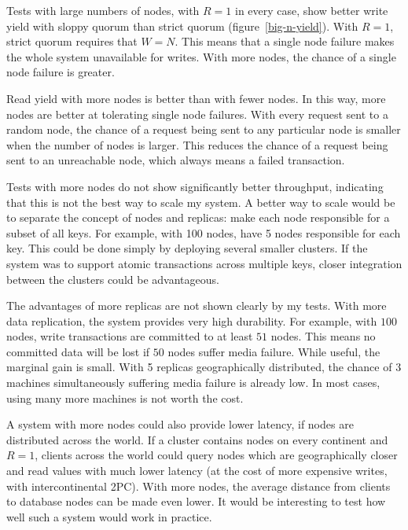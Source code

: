 \documentclass[12pt,a4paper,twoside,openany]{report}
\begin{document}
Tests with large numbers of nodes, with $R = 1$ in every case, show better write yield with sloppy quorum than strict quorum (figure~\ref{big-n-yield}). With $R = 1$, strict quorum requires that $W = N$. This means that a single node failure makes the whole system unavailable for writes. With more nodes, the chance of a single node failure is greater.

Read yield with more nodes is better than with fewer nodes. In this way, more nodes are better at tolerating single node failures. With every request sent to a random node, the chance of a request being sent to any particular node is smaller when the number of nodes is larger. This reduces the chance of a request being sent to an unreachable node, which always means a failed transaction.

Tests with more nodes do not show significantly better throughput, indicating that this is not the best way to scale my system. A better way to scale would be to separate the concept of nodes and replicas: make each node responsible for a subset of all keys. For example, with 100 nodes, have 5 nodes responsible for each key. This could be done simply by deploying several smaller clusters. If the system was to support atomic transactions across multiple keys, closer integration between the clusters could be advantageous.

The advantages of more replicas are not shown clearly by my tests. With more data replication, the system provides very high durability. For example, with $100$ nodes, write transactions are committed to at least $51$ nodes. This means no committed data will be lost if $50$ nodes suffer media failure. While useful, the marginal gain is small. With 5 replicas geographically distributed, the chance of 3 machines simultaneously suffering media failure is already low. In most cases, using many more machines is not worth the cost.

A system with more nodes could also provide lower latency, if nodes are distributed across the world. If a cluster contains nodes on every continent and $R = 1$, clients across the world could query nodes which are geographically closer and read values with much lower latency (at the cost of more expensive writes, with intercontinental 2PC). With more nodes, the average distance from clients to database nodes can be made even lower. It would be interesting to test how well such a system would work in practice.

%
%
\end{document}
